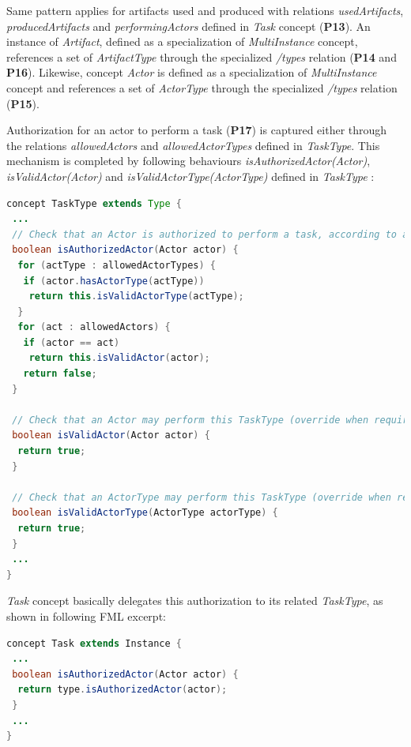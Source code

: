 Same pattern applies for artifacts used and produced with relations \textit{usedArtifacts}, \textit{producedArtifacts} and \textit{performingActors} defined in \textit{Task} concept (\textbf{P13}). An instance of \textit{Artifact}, defined as a specialization of \textit{MultiInstance} concept, references a set of \textit{ArtifactType} through the specialized \textit{/types} relation (\textbf{P14} and \textbf{P16}). Likewise, concept \textit{Actor} is defined as a specialization of \textit{MultiInstance} concept and references a set of \textit{ActorType} through the specialized \textit{/types} relation (\textbf{P15}).

Authorization for an actor to perform a task (\textbf{P17}) is captured either through the relations \textit{allowedActors} and \textit{allowedActorTypes} defined in \textit{TaskType}. This mechanism is completed by following behaviours \textit{isAuthorizedActor(Actor)}, \textit{isValidActor(Actor)} and \textit{isValidActorType(ActorType)} defined in \textit{TaskType} : 

\begin{lstlisting}[breaklines=true, language=java, basicstyle=\ttfamily\scriptsize, mathescape=true]
concept TaskType extends Type {
 ...
 // Check that an Actor is authorized to perform a task, according to allowed Actor and ActorTypes
 boolean isAuthorizedActor(Actor actor) {      
  for (actType : allowedActorTypes) {        
   if (actor.hasActorType(actType))         
    return this.isValidActorType(actType);          
  }        
  for (act : allowedActors) {        
   if (actor == act)         
    return this.isValidActor(actor);          
   return false;      
 }
  
 // Check that an Actor may perform this TaskType (override when required)
 boolean isValidActor(Actor actor) {
  return true;
 }

 // Check that an ActorType may perform this TaskType (override when required)
 boolean isValidActorType(ActorType actorType) {
  return true;
 }
 ...
}
\end{lstlisting}

\textit{Task} concept basically delegates this authorization to its related \textit{TaskType}, as shown in following FML excerpt:

\begin{lstlisting}[breaklines=true, language=java, basicstyle=\ttfamily\scriptsize, mathescape=true]
concept Task extends Instance {
 ...
 boolean isAuthorizedActor(Actor actor) {      
  return type.isAuthorizedActor(actor);      
 }  
 ...
}
\end{lstlisting}

